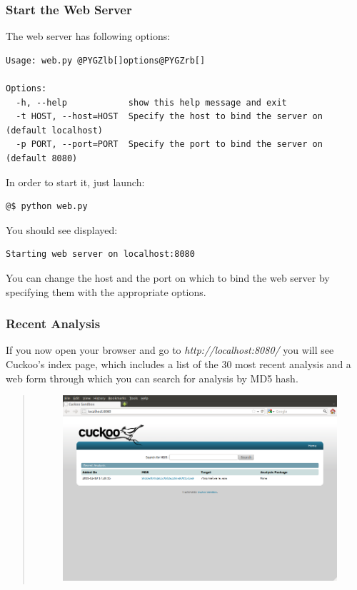 \documentclass[letterpaper,10pt,english]{sphinxmanual}
\begin{document}
\subsubsection{Start the Web Server}
\label{usage/web:start-the-web-server}
The web server has following options:

\begin{Verbatim}[commandchars=@\[\]]
Usage: web.py @PYGZlb[]options@PYGZrb[]

Options:
  -h, --help            show this help message and exit
  -t HOST, --host=HOST  Specify the host to bind the server on (default localhost)
  -p PORT, --port=PORT  Specify the port to bind the server on (default 8080)
\end{Verbatim}

In order to start it, just launch:

\begin{Verbatim}[commandchars=@\[\]]
@$ python web.py
\end{Verbatim}

You should see displayed:

\begin{Verbatim}[commandchars=@\[\]]
Starting web server on localhost:8080
\end{Verbatim}

You can change the host and the port on which to bind the web server by
specifying them with the appropriate options.


\subsubsection{Recent Analysis}
\label{usage/web:recent-analysis}
If you now open your browser and go to \emph{http://localhost:8080/} you will see
Cuckoo's index page, which includes a list of the 30 most recent analysis and
a web form through which you can search for analysis by MD5 hash.
\begin{quote}
\begin{figure}[htbp]
\centering

\includegraphics{cuckoo_web_index.png}
\end{figure}
\end{quote}
\end{document}
